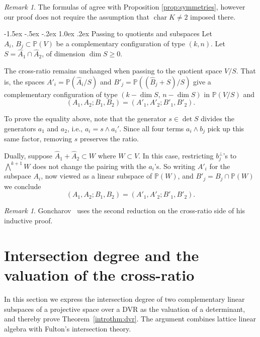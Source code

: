 \documentclass[11pt,a4paper]{amsart}
\makeatletter
\renewcommand\subsection{\@startsection{subsection}{2}{\z@}
                                   {-1.5ex \@plus -.5ex \@minus -.2ex}%
                                   {1.0ex \@plus.2ex}%
                                   {\normalfont\itshape}}%
\newcommand{\Pp}{\mathbb{P}}
\newcommand{\pv}{\mathbb{P}(V)}
\DeclareMathOperator{\Char}{char}
\theoremstyle{plain}
\theoremstyle{definition}
\theoremstyle{remark}
\newtheorem{remark}[theorem]{Remark}
\makeatother
\begin{document}
\begin{remark}
The formulas of \cite[Theorem 3]{HollandSparling2025} agree with Proposition \ref{prop:symmetries}, however our proof does not require the assumption that $\Char K\neq 2$ imposed there. 
\end{remark}

\subsection{Passing to quotients and subspaces}
Let $A_i,\,B_j\subset \pv$ be a complementary configuration of type $(k,n)$. Let $S=\hat{A}_1 \cap \hat{A}_2$, of dimension $\dim S\ge 0$.

The cross-ratio remains unchanged when passing to the quotient space $V/S$. That is, the spaces $A'_i = \mathbb{P}( \hat{A}_i / S)$ and $B'_j = \mathbb{P}((\hat{B}_j + S)/S)$ give a complementary configuration of type $(k-\dim S,\,n-\dim S)$ in $\Pp(V/S)$ and
\[
(A_1,A_2;B_1,B_2) = (A'_1,A'_2;B'_1,B'_2).
\]

To prove the equality above, note that the generator $ s \in\det S$ divides the generators $a_1$ and $a_2$, i.e., $a_i = s \wedge a_i'$. Since all four terms $a_i\wedge b_j$ pick up this same factor, removing $s$ preserves the ratio. 

Dually, suppose $\hat{A}_1+ \hat{A}_2\subset W$ where $W\subset V$. In this case, restricting $b^\perp_j$'s to $\bigwedge^{k+1}W$ does not change the pairing with the $a_i$'s. So writing $A'_i$ for the subspace $A_i$, now viewed as a linear subspace of $\mathbb{P}(W)$, and $B'_j = B_j\cap \mathbb{P}(W)$ we conclude
\[
(A_1,A_2;B_1,B_2) = (A'_1,A'_2;B'_1,B'_2).
\]

\begin{remark}
    Goncharov~\cite{Goncharov2026} uses the second reduction on the cross-ratio side of his inductive proof.
\end{remark}

\section{Intersection degree and the valuation of the cross-ratio}\label{sec:intersect}

In this section we express the intersection degree of two complementary linear subspaces of a projective space over a DVR as the valuation of a determinant, and thereby prove Theorem~\ref{introthm:dvr}. The argument combines lattice linear algebra with Fulton's intersection theory.
\end{document}
